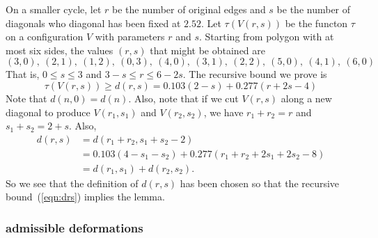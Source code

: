 On a smaller cycle, let $r$ be the number of original edges and $s$ be the number of diagonals who diagonal has been fixed at $2.52$.  Let $\tau(V(r,s))$ be the functon $\tau$ on a configuration $V$ with parameters $r$ and $s$.  Starting from polygon with at most six sides, the values $(r,s)$ that might be obtained are
$$
(3,0),~(2,1),~(1,2),~(0,3),~
(4,0),~(3,1),~(2,2),~
(5,0),~(4,1),~
(6,0)
$$
That is, $0\le s\le 3$ and $3-s\le r\le 6-2s$.
The recursive bound we prove is
\begin{equation}\label{eqn:drs}
\tau(V(r,s)) \ge d(r,s) = 0.103 (2-s) + 0.277 (r+2s-4) 
\end{equation}
Note that $d(n,0) = d(n)$. Also, note that if we cut
$V(r,s)$ along a new diagonal to produce $V(r_1,s_1)$
and $V(r_2,s_2)$, we have $r_1+r_2=r$ and $s_1+s_2 = 2+s$.
Also,
$$
\begin{array}{lll}
d(r,s) &= d(r_1+r_2,s_1+s_2-2) \\
  &=0.103 (4-s_1-s_2) + 0.277 (r_1+r_2+2s_1+2s_2-8) \\
  &=d(r_1,s_1) + d(r_2,s_2).
\end{array}
$$
So we see that the definition of $d(r,s)$ has been
chosen so that the recursive 
bound~(\ref{eqn:drs}) implies the
lemma.

\subsubsection{admissible deformations}

